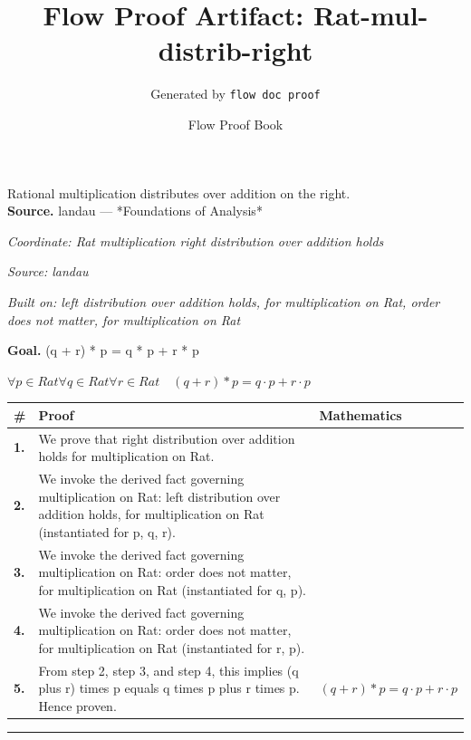 \documentclass[11pt]{article}
\title{Flow Proof Artifact: Rat-mul-distrib-right}
\author{Generated by \texttt{flow doc proof}}
\date{Flow Proof Book}
\theoremstyle{definition}
\begin{document}
\maketitle
Rational multiplication distributes over addition on the right.\\[0.5em]
\textbf{Source.} landau — *Foundations of Analysis*\\[0.5em]
\bigskip
{}\par
\smallskip\noindent\textit{Coordinate: Rat \cdot multiplication \cdot right distribution over addition holds}\par
\smallskip\noindent\textit{Source: landau}\par
\smallskip\noindent\textit{Built on: left distribution over addition holds, for multiplication on Rat, order does not matter, for multiplication on Rat}\par
\medskip
\noindent\textbf{Goal.} (q + r) * p = q * p + r * p\par
\noindent$\displaystyle \forall p \in Rat \forall q \in Rat \forall r \in Rat\quad (q + r) * p = q \cdot p + r \cdot p$\par
\medskip
\noindent
\begin{tabular}{@{} >{\raggedright\arraybackslash}p{} >{\raggedright\arraybackslash}p{} >{\raggedleft\arraybackslash}p{} @{}}
\textbf{\#} & \textbf{Proof} & \textbf{Mathematics} \\
\midrule
\textbf{1.} & We prove that right distribution over addition holds for multiplication on Rat. & \\[0.45em]
\textbf{2.} & We invoke the derived fact governing multiplication on Rat: left distribution over addition holds, for multiplication on Rat (instantiated for p, q, r). & \\[0.45em]
\textbf{3.} & We invoke the derived fact governing multiplication on Rat: order does not matter, for multiplication on Rat (instantiated for q, p). & \\[0.45em]
\textbf{4.} & We invoke the derived fact governing multiplication on Rat: order does not matter, for multiplication on Rat (instantiated for r, p). & \\[0.45em]
\textbf{5.} & From step 2, step 3, and step 4, this implies (q plus r) times p equals q times p plus r times p. Hence proven. & $\displaystyle (q + r) * p = q \cdot p + r \cdot p$ \\[0.45em]
\bottomrule
\end{tabular}
\label{thm:Rat-multiplication-right_distribution_over_addition_holds}
\par\medskip\hrule
\end{document}
